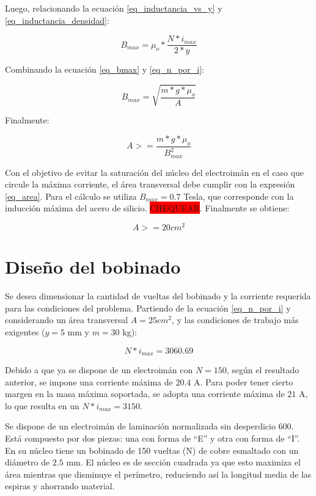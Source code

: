 \noindent Luego, relacionando la ecuación \ref{eq_inductancia_vs_y} y \ref{eq_inductancia_densidad}:

\begin{equation} \label{eq_bmax}
	B_{max}=\mu_{o}*\frac{N*i_{max}}{2*y}
\end{equation}

\noindent Combinando la ecuación \ref{eq_bmax} y \ref{eq_n_por_i}:

\begin{equation}
	B_{max}=\sqrt{\frac{m*g*\mu_{o}}{A}}
\end{equation}

\noindent Finalmente:

\begin{equation} \label{eq_area}
	A>=\frac{m*g*\mu_{o}}{B_{max}^{2}}
\end{equation}

\noindent Con el objetivo de evitar la saturación del núcleo del electroimán en el caso que circule la máxima corriente, el área transversal debe cumplir con la expresión \ref{eq_area}. Para el cálculo se utiliza $B_{max}=0.7$ Tesla, que corresponde con la inducción máxima del acero de silicio. \colorbox{red}{CHEQUEAR}. Finalmente se obtiene:

\begin{equation}
	A>=20 cm^{2}
\end{equation}

\section{Diseño del bobinado}

\noindent Se desea dimensionar la cantidad de vueltas del bobinado y la corriente requerida para las condiciones del problema. Partiendo de la ecuación \ref{eq_n_por_i} y considerando un área transversal $A=25 cm^{2}$, y las condiciones de trabajo más exigentes ($y=5$ mm y $m=30$ kg):

\begin{equation}
	N*i_{max}=3060.69 
\end{equation}

\noindent Debido a que ya se dispone de un electroimán con $N=150$, según el resultado anterior, se impone una corriente máxima de $20.4$ A. Para poder tener cierto margen en la masa máxima soportada, se adopta una corriente máxima de $21$ A, lo que resulta en un $N*i_{max}=3150$.

\noindent Se dispone de un electroimán  de laminación normalizada sin desperdicio 600. Está compuesto por dos piezas: una con forma de “E” y otra con forma de “I”. En su núcleo tiene un bobinado de 150 vueltas (N) de cobre esmaltado con un diámetro de $2.5$ mm. El núcleo es de sección cuadrada ya que esto maximiza el área mientras que disminuye el perímetro, reduciendo así la longitud media de las espiras y ahorrando material. 



